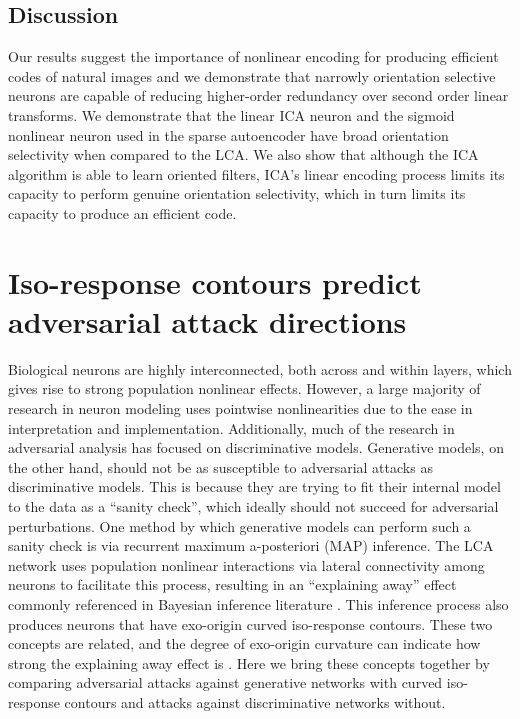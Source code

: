 \subsection{Discussion}
Our results suggest the importance of nonlinear encoding for producing efficient codes of natural images and we demonstrate that narrowly orientation selective neurons are capable of reducing higher-order redundancy over second order linear transforms.
We demonstrate that the linear ICA neuron and the sigmoid nonlinear neuron used in the sparse autoencoder have broad orientation selectivity when compared to the LCA.
We also show that although the ICA algorithm is able to learn oriented filters, ICA's linear encoding process limits its capacity to perform genuine orientation selectivity, which in turn limits its capacity to produce an efficient code.


\section{Iso-response contours predict adversarial attack directions}\label{sec:ch4_adv_defense}

Biological neurons are highly interconnected, both across and within layers, which gives rise to strong population nonlinear effects.
However, a large majority of research in neuron modeling uses pointwise nonlinearities due to the ease in interpretation and implementation.
Additionally, much of the research in adversarial analysis has focused on discriminative models.
Generative models, on the other hand, should not be as susceptible to adversarial attacks as discriminative models.
This is because they are trying to fit their internal model to the data as a ``sanity check'', which ideally should not succeed for adversarial perturbations.
One method by which generative models can perform such a sanity check is via recurrent maximum a-posteriori (MAP) inference.
The LCA network uses population nonlinear interactions via lateral connectivity among neurons to facilitate this process, resulting in an ``explaining away'' effect commonly referenced in Bayesian inference literature \parencite{olshausen2013perception}.
This inference process also produces neurons that have exo-origin curved iso-response contours.
These two concepts are related, and the degree of exo-origin curvature can indicate how strong the explaining away effect is \parencite{vilankar2017selectivity}.
Here we bring these concepts together by comparing adversarial attacks against generative networks with curved iso-response contours and attacks against discriminative networks without.


